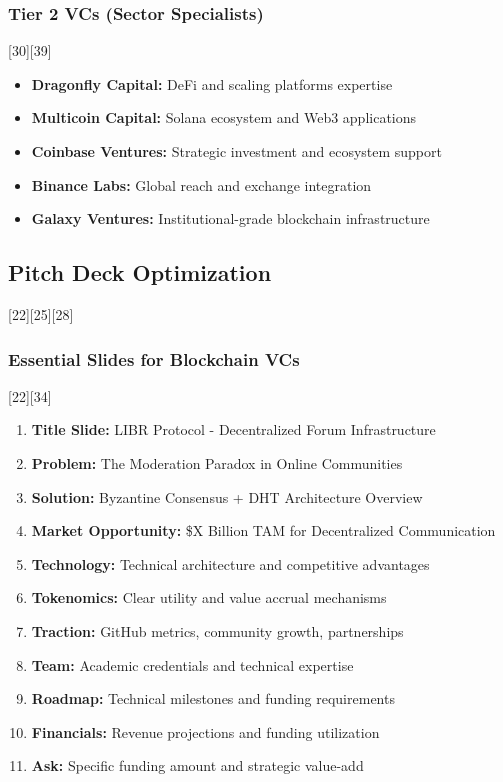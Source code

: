 \documentclass[12pt,a4paper]{article}
\begin{document}
\subsubsection{Tier 2 VCs (Sector Specialists)}[30][39]
\begin{itemize}
    \item \textbf{Dragonfly Capital:} DeFi and scaling platforms expertise
    \item \textbf{Multicoin Capital:} Solana ecosystem and Web3 applications  
    \item \textbf{Coinbase Ventures:} Strategic investment and ecosystem support
    \item \textbf{Binance Labs:} Global reach and exchange integration
    \item \textbf{Galaxy Ventures:} Institutional-grade blockchain infrastructure
\end{itemize}

\subsection{Pitch Deck Optimization}[22][25][28]

\subsubsection{Essential Slides for Blockchain VCs}[22][34]
\begin{enumerate}
    \item \textbf{Title Slide:} LIBR Protocol - Decentralized Forum Infrastructure
    \item \textbf{Problem:} The Moderation Paradox in Online Communities
    \item \textbf{Solution:} Byzantine Consensus + DHT Architecture Overview  
    \item \textbf{Market Opportunity:} \$X Billion TAM for Decentralized Communication
    \item \textbf{Technology:} Technical architecture and competitive advantages
    \item \textbf{Tokenomics:} Clear utility and value accrual mechanisms
    \item \textbf{Traction:} GitHub metrics, community growth, partnerships
    \item \textbf{Team:} Academic credentials and technical expertise
    \item \textbf{Roadmap:} Technical milestones and funding requirements
    \item \textbf{Financials:} Revenue projections and funding utilization
    \item \textbf{Ask:} Specific funding amount and strategic value-add
\end{enumerate}
\end{document}

